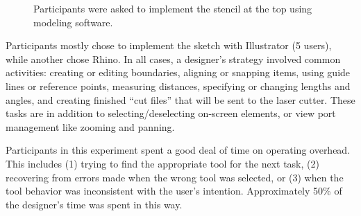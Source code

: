 \documentclass{article}
\begin{document}
\begin{figure}[h]
\centering 
{}

\caption{Participants were asked to implement the stencil at the top
  using modeling software.}
\label{fig:interview-sketch}
\end{figure}

Participants mostly chose to implement the sketch with Illustrator (5
users), while another chose Rhino. In all cases, a designer's strategy
involved common activities: creating or editing boundaries, aligning
or snapping items, using guide lines or reference points, measuring
distances, specifying or changing lengths and angles, and creating
finished ``cut files'' that will be sent to the laser cutter. These
tasks are in addition to selecting/deselecting on-screen elements, or
view port management like zooming and panning.

Participants in this experiment spent a good deal of time on operating
overhead. This includes (1) trying to find the appropriate tool for
the next task, (2) recovering from errors made when the wrong tool was
selected, or (3) when the tool behavior was inconsistent with the
user's intention. Approximately 50\% of the designer's time was spent
in this way.
\end{document}
